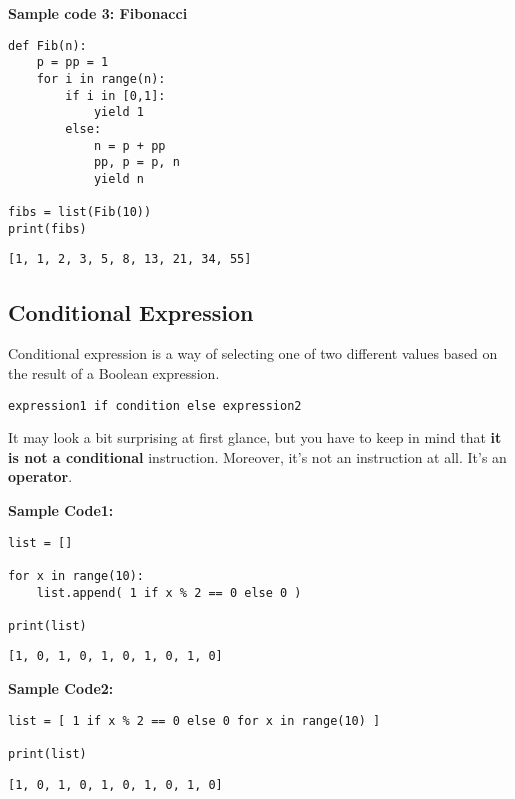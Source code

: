 \documentclass[11pt]{article}
\begin{document}
\textbf{Sample code 3: Fibonacci} 
\begin{verbatim}
def Fib(n):
	p = pp = 1
	for i in range(n):
		if i in [0,1]:
			yield 1
		else:
			n = p + pp
			pp, p = p, n
			yield n

fibs = list(Fib(10))
print(fibs)
\end{verbatim}

\begin{verbatim}
[1, 1, 2, 3, 5, 8, 13, 21, 34, 55]
\end{verbatim}

\newpage

\subsection{Conditional Expression}
\label{sec:org13b3184}
Conditional expression is a way of selecting one of two different
values based on the result of a Boolean expression.

\texttt{expression1 if condition else expression2}

It may look a bit surprising at first glance, but you have to keep in
mind that \textbf{it is not a conditional} instruction. Moreover, it’s not an
instruction at all. It’s an \textbf{operator}.

\vspace{10 mm}

\textbf{Sample Code1:}
\begin{verbatim}
list = []

for x in range(10):
	list.append( 1 if x % 2 == 0 else 0 )

print(list)
\end{verbatim}

\begin{verbatim}
[1, 0, 1, 0, 1, 0, 1, 0, 1, 0]
\end{verbatim}

\vspace{10 mm}

\textbf{Sample Code2:}
\begin{verbatim}
list = [ 1 if x % 2 == 0 else 0 for x in range(10) ]

print(list)
\end{verbatim}

\begin{verbatim}
[1, 0, 1, 0, 1, 0, 1, 0, 1, 0]
\end{verbatim}

\newpage
\end{document}
